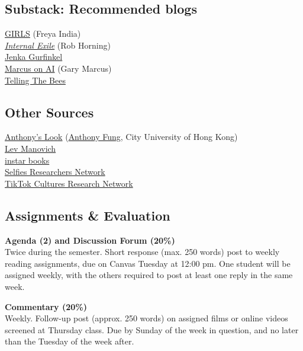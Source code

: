 \documentclass[
  letterpaper,
  DIV=11,
  numbers=noendperiod]{scrartcl}
\begin{document}
\subsection{Substack: Recommended
blogs}\label{substack-recommended-blogs}

\href{https://www.freyaindia.co.uk/}{GIRLS} (Freya India)\\
\href{https://robhorning.substack.com/}{\emph{Internal Exile}} (Rob
Horning)\\
\href{https://substack.com/@jenka?utm_source=top-search}{Jenka
Gurfinkel}\\
\href{https://substack.com/@garymarcus?utm_source=top-search}{Marcus on
AI} (Gary Marcus)\\
\href{https://tellthebeees.substack.com/archive?sort=new}{Telling The
Bees}

\subsection{Other Sources}\label{other-sources}

\href{https://www.instagram.com/anthonyslook/}{Anthony's Look}
(\href{https://www.com.cuhk.edu.hk/people/fung-anthony-y-h/}{Anthony
Fung}, City University of Hong Kong)\\
\href{https://manovich.net}{Lev Manovich}\\
\href{https://www.instarbooks.com/books/everyword.html}{instar books}\\
\href{https://selfieresearchers.com}{Selfies Researchers Network}\\
\href{https://tiktokcultures.com/}{TikTok Cultures Research Network}

\subsection{Assignments \& Evaluation}\label{assignments-evaluation}

\textbf{Agenda (2) and Discussion Forum (20\%)}\\
Twice during the semester. Short response (max. 250 words) post to
weekly reading assignments, due on Canvas Tuesday at 12:00 pm. One
student will be assigned weekly, with the others required to post at
least one reply in the same week.

\textbf{Commentary (20\%)}\\
Weekly. Follow-up post (approx. 250 words) on assigned films or online
videos screened at Thursday class. Due by Sunday of the week in
question, and no later than the Tuesday of the week after.
\end{document}

